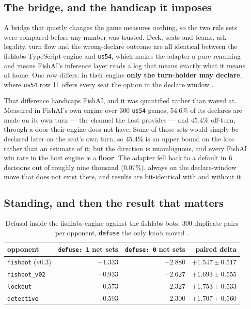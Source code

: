 \documentclass[11pt]{article}
\newcommand{\code}[1]{\texttt{#1}}
\newcommand{\usff}{\code{us54}}
\begin{document}
\subsection{The bridge, and the handicap it imposes}
\label{sec:bridge}

A bridge that quietly changes the game measures nothing, so the two rule sets were compared before
any number was trusted. Deck, seats and teams, ask legality, turn flow and the wrong-declare outcome
are all identical between the fishlabs TypeScript engine and \usff{}, which makes the adapter a pure
renaming and means FishAI's inference layer reads a log that means exactly what it means at home.
One row differs: in their engine \textbf{only the turn-holder may declare}, where \usff{} row 11
offers every seat the option in the declare window \cite{crossplay}.

That difference handicaps FishAI, and it was quantified rather than waved at. Measured in FishAI's
own engine over 300 \usff{} games, $54.6\%$ of its declares are made on its own turn --- the channel
the host provides --- and $\mathbf{45.4\%}$ off-turn, through a door their engine does not have.
Some of those sets would simply be declared later on the seat's own turn, so $45.4\%$ is an upper
bound on the loss rather than an estimate of it; but the direction is unambiguous, and every FishAI
win rate in the host engine is a \textbf{floor}. The adapter fell back to a default in 6 decisions
out of roughly nine thousand ($0.07\%$), always on the declare-window move that does not exist
there, and results are bit-identical with and without it.

\subsection{Standing, and then the result that matters}
\label{sec:standing}

\begin{table}[t]
\centering
\caption{Defusal inside the fishlabs engine against the fishlabs bots, 300 duplicate pairs
per opponent, \code{defuse} the only knob moved \cite{crossplay}.}
\label{tab:xplay}
\footnotesize
\begin{tabular}{@{}lrrr@{}}
\toprule
opponent & \code{defuse: 1} net sets & \code{defuse: 0} net sets & \textbf{paired delta} \\
\midrule
\code{fishbot} (v0.3)  & $-1.333$ & $-2.880$ & $\mathbf{+1.547 \pm 0.517}$ \\
\code{fishbot\_v02}    & $-0.933$ & $-2.627$ & $\mathbf{+1.693 \pm 0.555}$ \\
\code{lockout}         & $-0.573$ & $-2.327$ & $\mathbf{+1.753 \pm 0.533}$ \\
\code{detective}       & $-0.593$ & $-2.300$ & $\mathbf{+1.707 \pm 0.560}$ \\
\bottomrule
\end{tabular}
\end{table}
\end{document}
